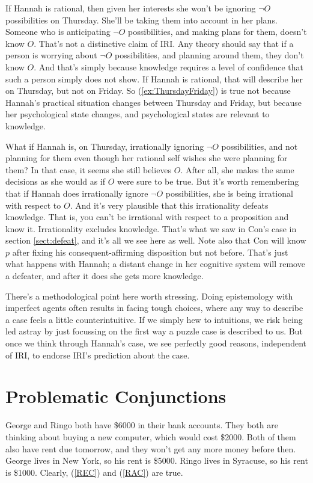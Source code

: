 \documentclass[oneside, a4paper]{book}
\begin{document}
If Hannah is rational, then given her interests she won't be ignoring \(\neg O\) possibilities on Thursday. She'll be taking them into account in her plans. Someone who is anticipating \(\neg O\) possibilities, and making plans for them, doesn't know \(O\). That's not a distinctive claim of IRI. Any theory should say that if a person is worrying about \(\neg O\) possibilities, and planning around them, they don't know \(O\). And that's simply because knowledge requires a level of confidence that such a person simply does not show. If Hannah is rational, that will describe her on Thursday, but not on Friday. So (\ref{ex:ThursdayFriday}) is true not because Hannah's practical situation changes between Thursday and Friday, but because her psychological state changes, and psychological states are relevant to knowledge.

What if Hannah is, on Thursday, irrationally ignoring \(\neg O\) possibilities, and not planning for them even though her rational self wishes she were planning for them? In that case, it seems she still believes \(O\). After all, she makes the same decisions as she would as if \(O\) were sure to be true. But it's worth remembering that if Hannah does irrationally ignore \(\neg O\) possibilities, she is being irrational with respect to \(O\). And it's very plausible that this irrationality defeats knowledge. That is, you can't be irrational with respect to a proposition and know it. Irrationality excludes knowledge. That's what we saw in Con's case in section \ref{sect:defeat}, and it's all we see here as well. Note also that Con will know $p$ after fixing his consequent-affirming disposition but not before. That's just what happens with Hannah; a distant change in her cognitive system will remove a defeater, and after it does she gets more knowledge.

There's a methodological point here worth stressing. Doing epistemology with imperfect agents often results in facing tough choices, where any way to describe a case feels a little counterintuitive. If we simply hew to intuitions, we risk being led astray by just focussing on the first way a puzzle case is described to us. But once we think through Hannah's case, we see perfectly good reasons, independent of IRI, to endorse IRI's prediction about the case.

\section{Problematic Conjunctions} \label{sect:conj}
 George and Ringo both have \$6000 in their bank accounts. They both are thinking about buying a new computer, which would cost \$2000. Both of them also have rent due tomorrow, and they won't get any more money before then. George lives in New York, so his rent is \$5000. Ringo lives in Syracuse, so his rent is \$1000. Clearly, (\ref{REC}) and (\ref{RAC}) are true.
\end{document}
